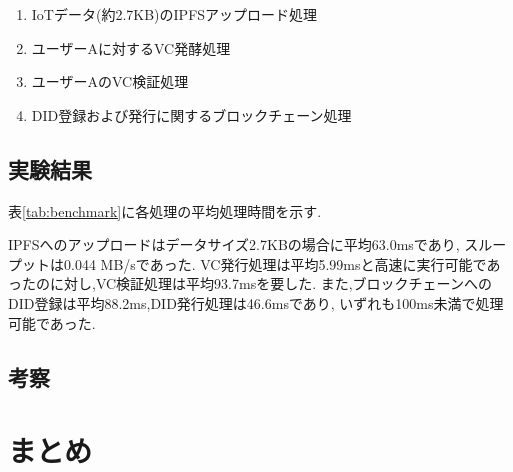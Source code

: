 \documentclass[a4paper,9pt,twocolumn]{ltjsarticle} %
\begin{document}
\begin{enumerate}
  \item IoTデータ(約2.7KB)のIPFSアップロード処理
  \item ユーザーAに対するVC発酵処理
  \item ユーザーAのVC検証処理
  \item DID登録および発行に関するブロックチェーン処理
\end{enumerate}

\subsection{実験結果}
表\ref{tab:benchmark}に各処理の平均処理時間を示す.

\begin{table}[H]
  \centering
  \caption{各処理のベンチマーク結果(平均値)}
  \label{tab:benchmark}
\end{table}

IPFSへのアップロードはデータサイズ2.7KBの場合に平均63.0msであり,
スループットは0.044 MB/sであった.
VC発行処理は平均5.99msと高速に実行可能であったのに対し,VC検証処理は平均93.7msを要した.
また,ブロックチェーンへのDID登録は平均88.2ms,DID発行処理は46.6msであり,
いずれも100ms未満で処理可能であった.

\subsection{考察}

\section{まとめ}



\end{document}
